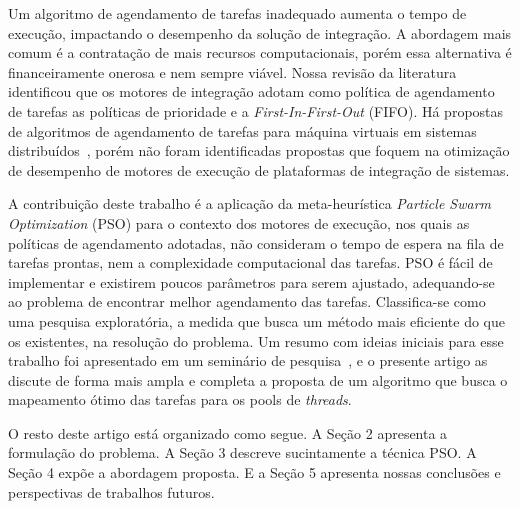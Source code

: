 Um algoritmo de agendamento de tarefas inadequado aumenta o tempo de execução, impactando o desempenho da solução de integração. A abordagem mais comum é a contratação de mais recursos computacionais, porém essa alternativa é financeiramente onerosa e nem sempre viável. Nossa revisão da literatura identificou que os motores de integração adotam como política de agendamento de tarefas as políticas de prioridade e a \textit{First-In-First-Out} (FIFO). Há propostas de algoritmos de agendamento de tarefas para máquina virtuais em sistemas distribuídos~\cite{rodriguez2014,al2015}, porém não foram identificadas propostas que foquem na otimização de desempenho de motores de execução de plataformas de integração de sistemas. 
%

A contribuição deste trabalho é a aplicação da meta-heurística \textit{Particle Swarm Optimization} (PSO) para o contexto dos motores de execução, nos quais as políticas de agendamento adotadas, não consideram o tempo de espera na fila de tarefas prontas, nem a complexidade computacional das tarefas. PSO é fácil de implementar e existirem poucos parâmetros para serem ajustado, adequando-se ao problema de encontrar melhor agendamento das tarefas. Classifica-se como uma pesquisa exploratória, a medida que busca um método mais eficiente do que os existentes, na resolução do problema. Um resumo com ideias iniciais para esse trabalho foi apresentado em um seminário de pesquisa~\cite{sellaro2017}, e o presente artigo as discute de forma mais ampla e completa  a proposta de um algoritmo que busca o mapeamento ótimo das tarefas para os pools de \emph{threads}.

O resto deste artigo está organizado como segue. A Seção 2 apresenta a formulação do problema. A Seção 3 descreve sucintamente a técnica PSO. A Seção 4 expõe a abordagem proposta. E a Seção 5 apresenta nossas conclusões e perspectivas de trabalhos futuros. 